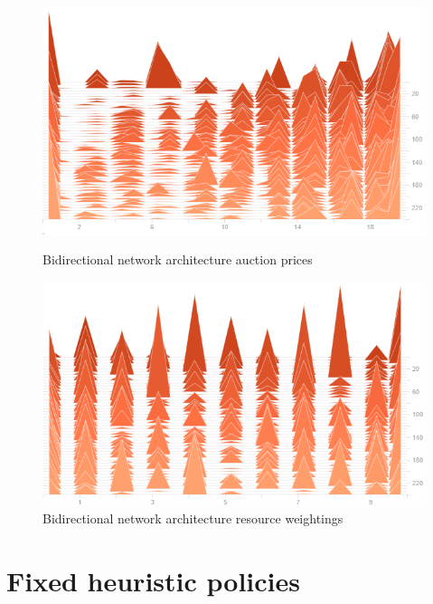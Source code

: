 \begin{figure}[h]
    \centering
    \begin{minipage}{0.5\textwidth}
        \centering
        \includegraphics[width=1.0\textwidth]{figures/net_arch_training_fig/bidirectional_architecture_auction_prices.png}
        \caption{Bidirectional network architecture auction prices}
        \label{fig:bidirectional-auction-prices}
    \end{minipage}\hfill
    \begin{minipage}{0.5\textwidth}
        \centering
        \includegraphics[width=1.0\textwidth]{figures/net_arch_training_fig/bidirectional_architecture_weightings.png}
        \caption{Bidirectional network architecture resource weightings}
        \label{fig:bidirectional-resource-weightings}
    \end{minipage}
\end{figure}

\section{Fixed heuristic policies}\label{sec:fixed-heuristic-policies}
